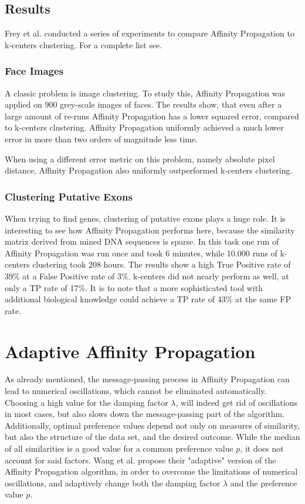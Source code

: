 \documentclass[11pt,a4paper]{article}
\begin{document}
\subsection{Results}
Frey et al. conducted a series of experiments to compare Affinity Propagation to k-centers clustering. For a complete list see\cite{frey2007clustering}.
\subsubsection{Face Images}
A classic problem is image clustering. To study this, Affinity Propagation was applied on 900 grey-scale images of faces. The results show, that even after a large amount of re-runs Affinity Propagation has a lower squared error, compared to k-centers clustering. Affinity Propagation uniformly achieved a much lower error in more than two orders of magnitude less time.\cite{frey2007clustering}

When using a different error metric on this problem, namely absolute pixel distance, Affinity Propagation also uniformly outperformed k-centers clustering. \cite{frey2007clustering}
\subsubsection{Clustering Putative Exons}
When trying to find genes, clustering of putative exons plays a huge role.\cite{frey2007clustering} It is interesting to see how Affinity Propagation performs here, because the similarity matrix derived from mined DNA sequences is sparse. In this task one run of Affinity Propagation was run once and took 6 minutes, while 10.000 runs of k-centers clustering took 208 hours. The results show a high True Positive rate of 39\% at a False Positive rate of 3\%. k-centers did not nearly perform as well, at only a TP rate of 17\%. It is to note that a more sophisticated tool with additional biological knowledge could achieve a TP rate of 43\% at the same FP rate.\cite{frey2007clustering}
\pagebreak
\section{Adaptive Affinity Propagation}
As already mentioned, the message-passing process in Affinity Propagation can lead to numerical oscillations, which cannot be eliminated automatically. Choosing a high value for the damping factor $\lambda$, will indeed get rid of oscillations in most cases, but also slows down the message-passing part of the algorithm. Additionally, optimal preference values depend not only on measures of similarity, but also the structure of the data set, and the desired outcome. While the median of all similarities is a good value for a common preference value $p$, it does not account for said factors. Wang et al. propose their "adaptive" version of the Affinity Propagation algorithm, in order to overcome the limitations of numerical oscillations, and adaptively change both the damping factor $\lambda$ and the preference value $p$.\cite{wang2008adaptive}
\end{document}
